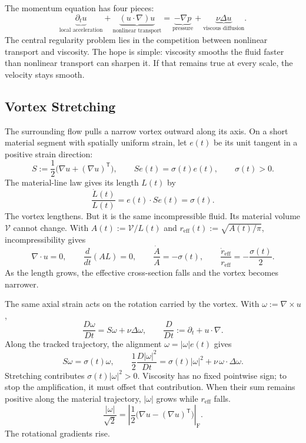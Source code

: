 
The momentum equation has four pieces:
\[
  \underbrace{\partial_t u}_{\text{local acceleration}}
  +
  \underbrace{(u\cdot\nabla)u}_{\text{nonlinear transport}}
  =
  \underbrace{-\nabla p}_{\text{pressure}}
  +
  \underbrace{\nu\Delta u}_{\text{viscous diffusion}}.
\]
The central regularity problem lies in the competition between nonlinear transport and viscosity.
The hope is simple: viscosity smooths the fluid faster than nonlinear transport can sharpen it.
If that remains true at every scale, the velocity stays smooth.

\subsection{Vortex Stretching}\label{sub:ThePerfectlyStretchingVortex}

The surrounding flow pulls a narrow vortex outward along its axis.
On a short material segment with spatially uniform strain, let \(e(t)\) be its unit tangent in a positive strain direction:
\[
  S:=\frac12\bigl(\nabla u+(\nabla u)^{\mathsf T}\bigr),
  \qquad
  Se(t)=\sigma(t)e(t),
  \qquad
  \sigma(t)>0.
\]
The material-line law gives its length \(L(t)\) by
\[
  \frac{\dot L(t)}{L(t)}
  =
  e(t)\cdot Se(t)
  =
  \sigma(t).
\]
The vortex lengthens.
But it is the same incompressible fluid.
Its material volume \(\mathcal V\) cannot change.
With \(A(t):=\mathcal V/L(t)\) and \(r_{\mathrm{eff}}(t):=\sqrt{A(t)/\pi}\), incompressibility gives
\[
  \nabla\cdot u=0,
  \qquad
  \frac{d}{dt}(A L)=0,
  \qquad
  \frac{\dot A}{A}=-\sigma(t),
  \qquad
  \frac{\dot r_{\mathrm{eff}}}{r_{\mathrm{eff}}}
  =
  -\frac{\sigma(t)}{2}.
\]
As the length grows, the effective cross-section falls and the vortex becomes narrower.

The same axial strain acts on the rotation carried by the vortex.
With \(\omega:=\nabla\times u\),
\[
  \frac{D\omega}{Dt}
  =
  S\omega+\nu\Delta\omega,
  \qquad
  \frac{D}{Dt}
  :=
  \partial_t+u\cdot\nabla.
\]
Along the tracked trajectory, the alignment \(\omega=|\omega|e(t)\) gives
\[
  S\omega
  =
  \sigma(t)\omega,
  \qquad
  \frac12\frac{D|\omega|^2}{Dt}
  =
  \sigma(t)|\omega|^2
  +
  \nu\,\omega\cdot\Delta\omega.
\]
Stretching contributes \(\sigma(t)|\omega|^2>0\).
Viscosity has no fixed pointwise sign; to stop the amplification, it must offset that contribution.
When their sum remains positive along the material trajectory, \(|\omega|\) grows while \(r_{\mathrm{eff}}\) falls.
\[
  \frac{|\omega|}{\sqrt2}
  =
  \left|\frac12\bigl(\nabla u-(\nabla u)^{\mathsf T}\bigr)\right|_{\mathrm F}.
\]
The rotational gradients rise.

